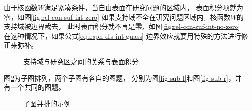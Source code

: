 由于核函数$W$满足紧凑条件，当自由表面在研究问题的区域内，
表面积分项就为零，如图\ref{fig:rel-con-suf-int-zero}
如果支持域不全在研究问题区域内，核函数$W$的支持域被边界截去，
此时表面积分就不再是零，如图\ref{fig:rel-con-suf-int-no-zero}
在这种情况下，如果公式\ref{equ:sph-dis-int-guass}
边界效应就要用特殊的方法进行修正来弥补。
\begin{figure}[h!]
    \centering
    \hspace{3em} %
    \caption{支持域与研究区之间的关系与表面积分}
    \label{fig:rel-con-suf-int}
\end{figure}

图\ref{fig-sub}为子图排列，两个子图有各自的图题，
分别为图\ref{fig-sub-l}和图\ref{fig-sub-r}，并有一个共同的图题。
\begin{figure}[h!]
    \centering
    \hspace{7em} %
    \caption{子图并排的示例}
    \label{fig-sub}
\end{figure}

